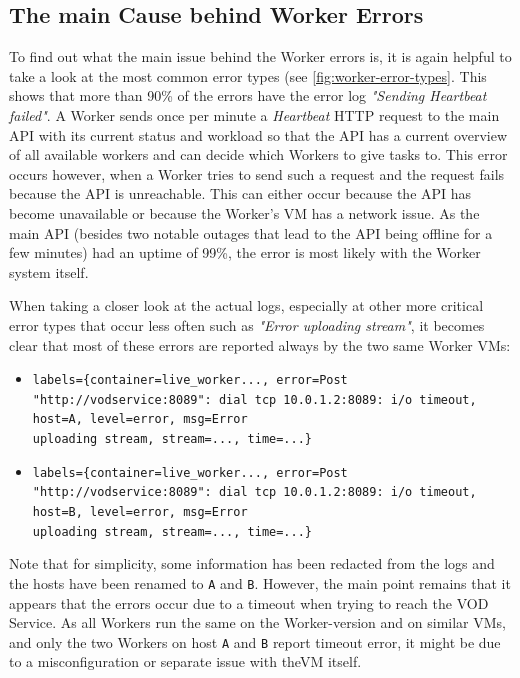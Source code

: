 \subsection{The main Cause behind Worker Errors}

To find out what the main issue behind the Worker errors is, it is again helpful to take a look at the most common error types (see \autoref{fig:worker-error-types}. This shows that more than 90\% of the errors have the error log \textit{"Sending Heartbeat failed"}. A Worker sends once per minute a \textit{Heartbeat} HTTP request to the main \ac{API} with its current status and workload so that the \ac{API} has a current overview of all available workers and can decide which Workers to give tasks to. This error occurs however, when a Worker tries to send such a request and the request fails because the \ac{API} is unreachable. This can either occur because the \ac{API} has become unavailable or because the Worker's \ac{VM} has a network issue. As the main \ac{API} (besides two notable outages that lead to the API being offline for a few minutes) had an uptime of 99\%, the error is most likely with the Worker system itself. 

When taking a closer look at the actual logs, especially at other more critical error types that occur less often such as \textit{"Error uploading stream"}, it becomes clear that most of these errors are reported always by the two same Worker \ac{VM}s:

\begin{itemize}
    \item \texttt{labels=\{container=live\_worker..., error=Post "http://vodservice:8089": dial tcp 10.0.1.2:8089: i/o timeout, host=A, level=error, msg=Error\\ uploading stream, stream=..., time=...\}}

    \item \texttt{labels=\{container=live\_worker..., error=Post "http://vodservice:8089": dial tcp 10.0.1.2:8089: i/o timeout, host=B, level=error, msg=Error\\ uploading stream, stream=..., time=...\}}
\end{itemize}

Note that for simplicity, some information has been redacted from the logs and the hosts have been renamed to \texttt{A} and \texttt{B}. However, the main point remains that it appears that the errors occur due to a timeout when trying to reach the VOD Service. As all Workers run the same on the Worker-version and on similar \ac{VM}s, and only the two Workers on host \texttt{A} and \texttt{B} report timeout error, it might be due to a misconfiguration or separate issue with the\ac{VM} itself. 

